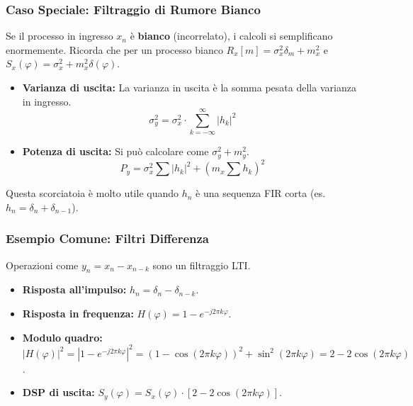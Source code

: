 \subsubsection{Caso Speciale: Filtraggio di Rumore Bianco}
Se il processo in ingresso $x_n$ è \textbf{bianco} (incorrelato), i calcoli si semplificano enormemente.
Ricorda che per un processo bianco $R_x[m] = \sigma_x^2\delta_m + m_x^2$ e $S_x(\varphi) = \sigma_x^2 + m_x^2\delta(\varphi)$.
\begin{itemize}
    \item \textbf{Varianza di uscita:} La varianza in uscita è la somma pesata della varianza in ingresso.
    $$ \sigma_y^2 = \sigma_x^2 \cdot \sum_{k=-\infty}^{\infty} |h_k|^2 $$
    \item \textbf{Potenza di uscita:} Si può calcolare come $\sigma_y^2 + m_y^2$.
    $$ P_y = \sigma_x^2 \sum |h_k|^2 + (m_x \sum h_k)^2 $$
\end{itemize}
Questa scorciatoia è molto utile quando $h_n$ è una sequenza FIR corta (es. $h_n = \delta_n + \delta_{n-1}$).

\subsubsection{Esempio Comune: Filtri Differenza}
Operazioni come $y_n = x_n - x_{n-k}$ sono un filtraggio LTI.
\begin{itemize}
    \item \textbf{Risposta all'impulso:} $h_n = \delta_n - \delta_{n-k}$.
    \item \textbf{Risposta in frequenza:} $H(\varphi) = 1 - e^{-j2\pi k\varphi}$.
    \item \textbf{Modulo quadro:} $|H(\varphi)|^2 = |1 - e^{-j2\pi k\varphi}|^2 = (1 - \cos(2\pi k\varphi))^2 + \sin^2(2\pi k\varphi) = 2 - 2\cos(2\pi k\varphi)$.
    \item \textbf{DSP di uscita:} $S_y(\varphi) = S_x(\varphi) \cdot [2 - 2\cos(2\pi k\varphi)]$.
\end{itemize}

